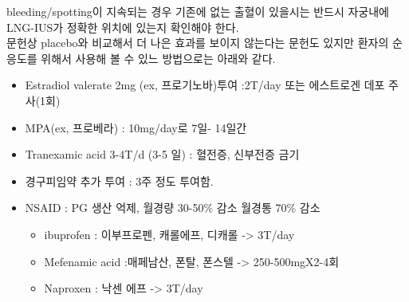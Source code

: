\begin{commentbox}{bleeding/spotting이 지속되는 경우}
기존에 없는 출혈이 있을시는 반드시 자궁내에 LNG-IUS가 정확한 위치에 있는지 확인해야 한다.\\
문헌상 placebo와 비교해서 더 나은 효과를 보이지 않는다는 문헌도 있지만 환자의 순응도를 위해서 사용해 볼 수 있느 방법으로는 아래와 같다.
\begin{itemize}\tightlist
\item Estradiol valerate 2mg (ex, 프로기노바)투여 :2T/day 또는 에스트로겐 데포 주사(1회)
\item MPA(ex, 프로베라) : 10mg/day로 7일- 14일간
\item Tranexamic acid 3-4T/d (3-5 일) : 혈전증, 신부전증 금기
\item 경구피임약 추가 투여 : 3주 정도 투여함.
\item NSAID : PG 생산 억제, 월경량 30-50\% 감소 월경통 70\% 감소
	\begin{itemize}\tightlist
	\item ibuprofen : 이부프로펜, 캐롤에프, 디캐롤 -> 3T/day
	\item Mefenamic acid :매페남산, 폰탈, 폰스텔 -> 250-500mgX2-4회
	\item Naproxen :  낙센 에프 -> 3T/day
	\end{itemize}
\end{itemize}
\end{commentbox}

